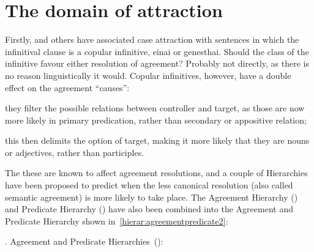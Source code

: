 \documentclass[a4paper, 12pt, article]{memoir}
\begin{document}
\chapter{The domain of attraction} %

Firstly, \textcite{KG} and others have associated case attraction with sentences
in which the infinitival clause is a copular infinitive, einai or genesthai.
Should the class of the infinitive favour either resolution of agreement?
Probably not directly, as there is no reason linguistically it would.
Copular infinitives, however, have a double effect on the agreement ``causes'':
\begin{compactenum}
\item they filter the possible relations between controller and target, as those are
now more likely in primary predication, rather than secondary or appositive
relation;
\item this then delimits the option of target, making it more likely that they are nouns or adjectives, rather than participles.
\end{compactenum}

The these are known to affect agreement resolutions, and a couple of Hierarchies
have been proposed to predict when the less canonical resolution (also called
semantic agreement) is more likely to take place. The Agreement Hierarchy
(\cite{Corbett1979}) and Predicate Hierarchy (\cite{Comrie1975}) have also been
combined into the Agreement and Predicate Hierarchy shown
in~\ref{hierar:agreementpredicate2}:

\ex.\label{hierar:agreementpredicate2} Agreement and Predicate Hierarchies~(\cite[233]{Corbett2006}):\\
\end{document}
